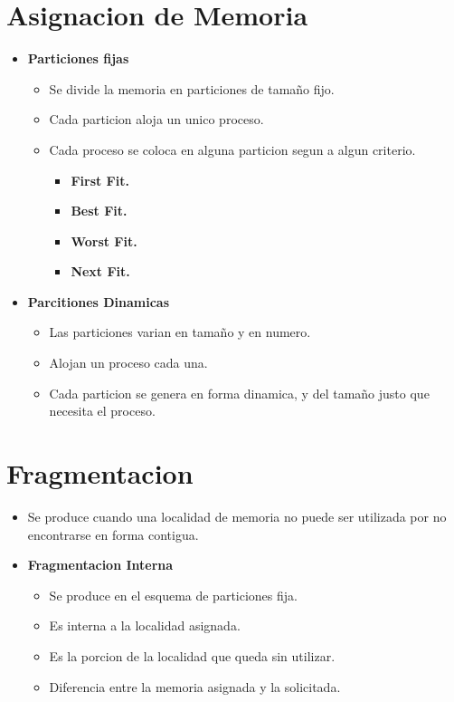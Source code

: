 \documentclass[12pt]{article}
\begin{document}
\section{Asignacion de Memoria}
\begin{itemize}
    \item \textbf{Particiones fijas}
        \begin{itemize}
            \item Se divide la memoria en particiones de tamaño fijo.
            \item Cada particion aloja un unico proceso.
            \item Cada proceso se coloca en alguna particion segun a algun criterio.
            \begin{itemize}
                \item \textbf{First Fit.}
                \item \textbf{Best Fit.}
                \item \textbf{Worst Fit.}
                \item \textbf{Next Fit.}
            \end{itemize}
        \end{itemize}
    \item \textbf{Parcitiones Dinamicas}
        \begin{itemize}
            \item Las particiones varian en tamaño y en numero.
            \item Alojan un proceso cada una.
            \item Cada particion se genera en forma dinamica, y del tamaño justo que necesita el proceso.
        \end{itemize}
\end{itemize}

\section{Fragmentacion}
\begin{itemize}
    \item Se produce cuando una localidad de memoria no puede ser utilizada por no encontrarse en forma contigua.
    \item \textbf{Fragmentacion Interna}
    \begin{itemize}
        \item Se produce en el esquema de particiones fija.
        \item Es interna a la localidad asignada.
        \item Es la porcion de la localidad que queda sin utilizar.
        \item Diferencia entre la memoria asignada y la solicitada.
    \end{itemize}
\end{itemize}
    
\end{document}
